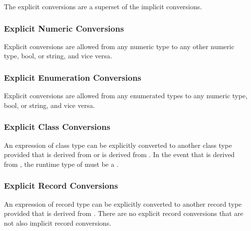 The explicit conversions are a superset of the implicit conversions.

\subsubsection{Explicit Numeric Conversions}
\label{Explicit_Numeric_Conversions}

Explicit conversions are allowed from any numeric type to any other
numeric type, bool, or string, and vice versa.

\subsubsection{Explicit Enumeration Conversions}
\label{Explicit_Enumeration_Conversions}

Explicit conversions are allowed from any enumerated types to any
numeric type, bool, or string, and vice versa.

\subsubsection{Explicit Class Conversions}
\label{Explicit_Class_Conversions}

An expression of class type  can be explicitly converted to
another class type  provided that  is derived
from  or  is derived from .  In the event
that  is derived from , the runtime type of 
must be a .

\subsubsection{Explicit Record Conversions}
\label{Explicit_Record_Conversions}

An expression of record type  can be explicitly converted to
another record type  provided that  is derived
from .  There are no explicit record conversions that are not
also implicit record conversions.
